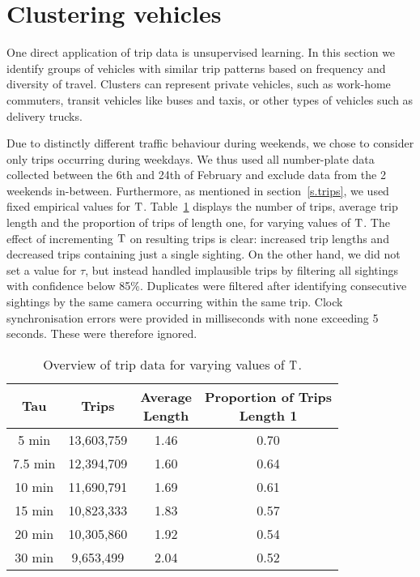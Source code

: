 \section{Clustering vehicles}\label{s.classification}

One direct application of trip data is unsupervised learning. In this section we identify groups of vehicles with similar trip patterns based on frequency and diversity of travel. Clusters can represent private vehicles, such as work-home commuters, transit vehicles like buses and taxis, or other types of vehicles such as delivery trucks.

Due to distinctly different traffic behaviour during weekends, we chose to consider only trips occurring during weekdays. We thus used all number-plate data collected between the 6th and 24th of February and exclude data from the 2 weekends in-between. Furthermore, as mentioned in section~\ref{s.trips}, we used fixed empirical values for $\mathrm{T}$. Table~\ref{t:trips-tau} displays the number of trips, average trip length and the proportion of trips of length one, for varying values of $\mathrm{T}$. The effect of incrementing $\mathrm{T}$ on resulting trips is clear: increased trip lengths and decreased trips containing just a single sighting. On the other hand, we did not set a value for $\tau$, but instead handled implausible trips by filtering all sightings with confidence below 85\%. Duplicates were filtered after identifying consecutive sightings by the same camera occurring within the same trip. Clock synchronisation errors were provided in milliseconds with none exceeding 5 seconds. These were therefore ignored.

\begin{table}[t]
\centering
\tabcolsep=0.25cm
\begin{tabular}{c c c c}
  \hline
Tau & Trips & \thead{Average\\Length} & \thead{Proportion of Trips \\ Length 1} \\
  \hline
5 min & 13,603,759 & 1.46 & 0.70 \\
7.5 min & 12,394,709 & 1.60 & 0.64 \\
10 min & 11,690,791 & 1.69 & 0.61 \\
15 min & 10,823,333 & 1.83 & 0.57 \\
20 min & 10,305,860 & 1.92 & 0.54 \\
30 min &  9,653,499 & 2.04 & 0.52 \\
   \hline
\end{tabular}
\caption{Overview of trip data for varying values of $\mathrm{T}$.}
\label{t:trips-tau}
\end{table}

